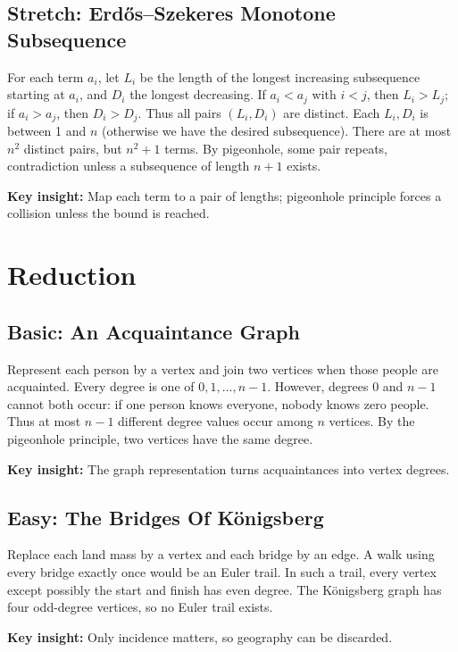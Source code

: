 \documentclass[12pt]{article}
\newcommand{\insight}[1]{\par\medskip\noindent\textbf{Key insight:} #1}
\begin{document}
\subsection*{Stretch: Erd\H{o}s--Szekeres Monotone Subsequence}
For each term $a_i$, let $L_i$ be the length of the longest increasing
subsequence starting at $a_i$, and $D_i$ the longest decreasing. If
$a_i<a_j$ with $i<j$, then $L_i>L_j$; if $a_i>a_j$, then $D_i>D_j$.
Thus all pairs $(L_i,D_i)$ are distinct. Each $L_i,D_i$ is between 1
and $n$ (otherwise we have the desired subsequence). There are at most
$n^2$ distinct pairs, but $n^2+1$ terms. By pigeonhole, some pair
repeats, contradiction unless a subsequence of length $n+1$ exists.
\insight{Map each term to a pair of lengths; pigeonhole principle forces a collision unless the bound is reached.}

\section{Reduction}

\subsection*{Basic: An Acquaintance Graph}
Represent each person by a vertex and join two vertices when those
people are acquainted. Every degree is one of $0,1,\ldots,n-1$.
However, degrees 0 and $n-1$ cannot both occur: if one person knows
everyone, nobody knows zero people. Thus at most $n-1$ different
degree values occur among $n$ vertices. By the pigeonhole principle,
two vertices have the same degree.
\insight{The graph representation turns acquaintances into vertex degrees.}

\subsection*{Easy: The Bridges Of K\"onigsberg}
Replace each land mass by a vertex and each bridge by an edge. A walk
using every bridge exactly once would be an Euler trail. In such a
trail, every vertex except possibly the start and finish has even
degree. The K\"onigsberg graph has four odd-degree vertices, so no
Euler trail exists.
\insight{Only incidence matters, so geography can be discarded.}
\end{document}
